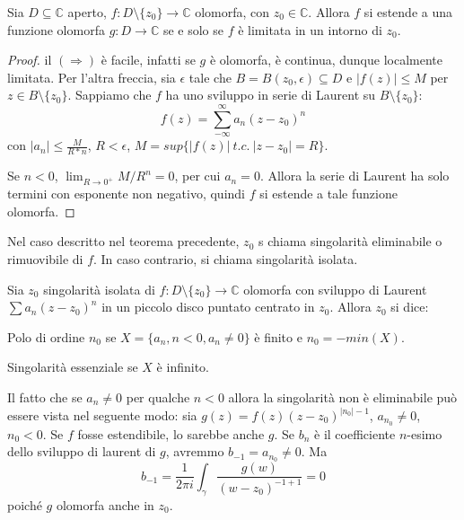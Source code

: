 \newcommand{\C}{\mathbb{C}}
\begin{thm}
    Sia $D\subseteq\C$ aperto, $f:D\setminus\{z_0\}\rightarrow\C$ olomorfa, con
    $z_0\in\C$. Allora $f$ si estende a una funzione olomorfa $g:D\rightarrow\C$
    se e solo se $f$ \`e limitata in un intorno di $z_0$.
\end{thm}
\begin{proof}
    il $(\Rightarrow)$ \`e facile, infatti se $g$ \`e olomorfa, \`e continua,
    dunque localmente limitata. Per l'altra freccia, sia $\epsilon$ tale che 
    $B = B(z_0,\epsilon)\subseteq D$ e $|f(z)|\leq M$ per $z\in B\setminus
    \{z_0\}$. Sappiamo che $f$ ha uno sviluppo in serie di Laurent su
    $B\setminus \{z_0\}$:
    \[
        f(z) = \sum_{-\infty}^\infty a_n (z-z_0)^n
    \]
    con $|a_n|\leq\frac{M}{R*n}$, $R<\epsilon$, $M=sup\{|f(z)|\ t.c.\
    |z-z_0|=R\}$.

    Se $n<0$, $\lim_{R\rightarrow 0^+} M/R^n = 0$, per cui $a_n = 0$. Allora la
    serie di Laurent ha solo termini con esponente non negativo, quindi $f$ si
    estende a tale funzione olomorfa.
\end{proof}

\begin{defn}
    Nel caso descritto nel teorema precedente, $z_0$ s chiama singolarit\`a
    eliminabile o rimuovibile di $f$. In caso contrario, si chiama singolarit\`a
    isolata.
\end{defn}

\begin{defn}
    Sia $z_0$ singolarit\`a isolata di $f:D\setminus\{z_0\}\rightarrow\C$
    olomorfa con sviluppo di Laurent $\sum a_n (z-z_0)^n$ in un piccolo disco
    puntato centrato in $z_0$. Allora $z_0$ si dice:
    \begin{nlist}
        \item   
            Polo di ordine $n_0$ se $X=\{a_n, n<0, a_n\neq 0\}$ \`e finito e
            $n_0 = -min(X)$.
        \item
            Singolarit\`a essenziale se $X$ \`e infinito.
    \end{nlist}
\end{defn}

\begin{oss}
    Il fatto che se $a_n\neq 0 $ per qualche $n<0$ allora la singolarit\`a non
    \`e eliminabile pu\`o essere vista nel seguente modo: sia $g(z) =
    f(z)(z-z_0)^{|n_0|-1}$, $a_{n_0}\neq 0$, $n_0<0$. Se $f$ fosse estendibile,
    lo sarebbe anche $g$. Se $b_n$ \`e il coefficiente $n$-esimo dello sviluppo
    di laurent di $g$, avremmo $b_{-1} = a_{n_0} \neq 0$.
    Ma 
    \[  
        b_{-1} = \frac{1}{2\pi i} \int_\gamma \frac{g(w)}{(w-z_0)^{-1+1}} = 0
    \]
    poich\'e $g$ olomorfa anche in $z_0$.
\end{oss}
